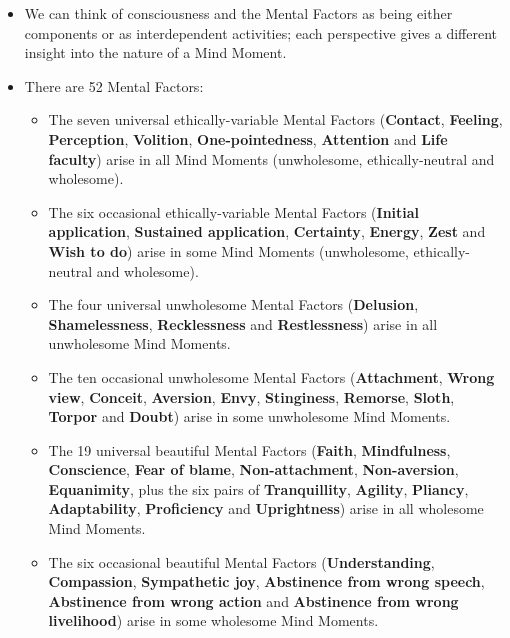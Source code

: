 \begin{itemize}

\item We can think of consciousness and the Mental Factors as being either components or as interdependent activities; each perspective gives a different insight into the nature of a Mind Moment.

\item There are 52 Mental Factors:

\begin{itemize}

\item The seven universal ethically-variable Mental Factors (\textbf{Contact}, \textbf{Feeling}, \textbf{Perception}, \textbf{Volition}, \textbf{One-pointedness}, \textbf{Attention} and \textbf{Life faculty}) arise in all Mind Moments (unwholesome, ethically-neutral and wholesome).

\item The six occasional ethically-variable Mental Factors (\textbf{Initial application}, \textbf{Sustained application}, \textbf{Certainty}, \textbf{Energy}, \textbf{Zest} and \textbf{Wish to do}) arise in some Mind Moments (unwholesome, ethically-neutral and wholesome).

\item The four universal unwholesome Mental Factors (\textbf{Delusion}, \textbf{Shamelessness}, \textbf{Recklessness} and \textbf{Restlessness}) arise in all unwholesome Mind Moments.

\item The ten occasional unwholesome Mental Factors (\textbf{Attachment}, \textbf{Wrong view}, \textbf{Conceit}, \textbf{Aversion}, \textbf{Envy}, \textbf{Stinginess}, \textbf{Remorse}, \textbf{Sloth}, \textbf{Torpor} and \textbf{Doubt}) arise in some unwholesome Mind Moments.

\item The 19 universal beautiful Mental Factors (\textbf{Faith}, \textbf{Mindfulness}, \textbf{Conscience}, \textbf{Fear of blame}, \textbf{Non-attachment}, \textbf{Non-aversion}, \textbf{Equanimity}, plus the six pairs of \textbf{Tranquillity}, \textbf{Agility}, \textbf{Pliancy}, \textbf{Adaptability}, \textbf{Proficiency} and \textbf{Uprightness}) arise in all wholesome Mind Moments.

\item The six occasional beautiful Mental Factors (\textbf{Understanding}, \textbf{Compassion}, \textbf{Sympathetic joy}, \textbf{Abstinence from wrong speech}, \textbf{Abstinence from wrong action} and \textbf{Abstinence from wrong livelihood}) arise in some wholesome Mind Moments.


\end{itemize}
\end{itemize}
